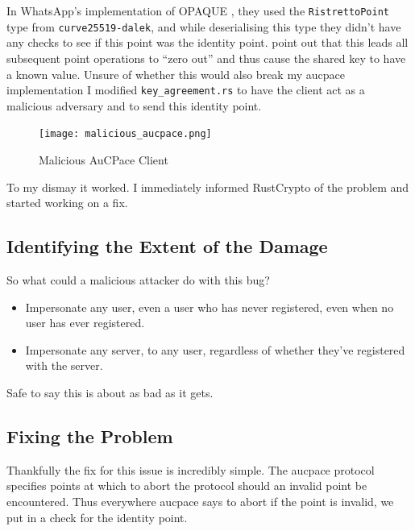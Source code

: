 In WhatsApp's implementation of OPAQUE \cite{opaque}, they used the \texttt{RistrettoPoint} type from \texttt{curve25519-dalek}, and while deserialising this type they didn't have any checks to see if this point was the identity point.
 point out that this leads all subsequent point operations to \enquote{zero out} and thus cause the shared key to have a known value.
Unsure of whether this would also break my \gls{aucpace} implementation I modified \texttt{key\_agreement.rs} to have the client act as a malicious adversary and to send this identity point.


\begin{figure}[H]
  \centering

  \texttt{[image: malicious\_aucpace.png]}
  \caption{Malicious AuCPace Client}
  \label{fig:break-everything}
\end{figure}

To my dismay it worked.
I immediately informed RustCrypto of the problem and started working on a fix.

\subsection{Identifying the Extent of the Damage}
So what could a malicious attacker do with this bug?

\begin{itemize}
  \item{Impersonate any user, even a user who has never registered, even when no user has ever registered.}
  \item{Impersonate any server, to any user, regardless of whether they've registered with the server.}
\end{itemize}

Safe to say this is about as bad as it gets.

\subsection{Fixing the Problem}
Thankfully the fix for this issue is incredibly simple.
The \gls{aucpace} protocol specifies points at which to abort the protocol should an invalid point be encountered.
Thus everywhere \gls{aucpace} says to abort if the point is invalid, we put in a check for the identity point.


